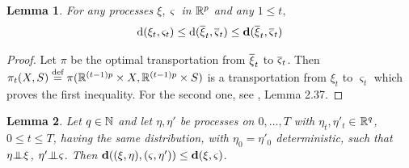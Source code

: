 \documentclass{article}              %
\newtheorem{lemma}{Lemma}
\begin{document}
\begin{lemma}
\label{lem:ddd}For any processes $\xi,\varsigma$ in $\mathbb{R}^{p}$ and
any $1\leq t,$
\[
\mathrm{d}(\xi_{t},\varsigma_{t})\leq\mathrm{d}(\overline{\xi}_{t},\overline{\varsigma}_{t})\leq\mathbf{d}(\overline{\xi}_{t},\overline{\varsigma}_{t})
\]
\end{lemma}

\begin{proof}
Let $\pi$ be the optimal transportation from $\overline{\xi}_{t}$ to $\overline{\varsigma}_{t}$.
Then $\pi_{t}(X,S)\stackrel{\text{\rm def}}{=} \pi(\mathbb{R}^{(t-1)p}\times X,\mathbb{R}^{(t-1)p}\times S)$
is a transportation from $\xi_{t}$ to $\varsigma_{t}$ which proves the
first inequality. For the second one, see \cite{pflug2014multistage},
Lemma 2.37.
\end{proof}
 
\begin{lemma}
\label{lem:indep}Let  $q\in \mathbb{N}$ and let $\eta,\eta'$ be processes on ${0,\dots,T}$ with $\eta_{t},\eta'_{t}\in$$\mathbb{R}^{q}$, $0\leq t\leq T$, 
having the same distribution, 
with $\eta_{0}=\eta'_{0}$
deterministic, such that $\eta\indep{\xi}$, \textup{$\eta'\indep{\varsigma}$.
}Then $\mathbf{d}((\xi,\eta),(\varsigma,\eta'))\leq\mathbf{d}(\xi,\varsigma)$.
\end{lemma}
\end{document}
